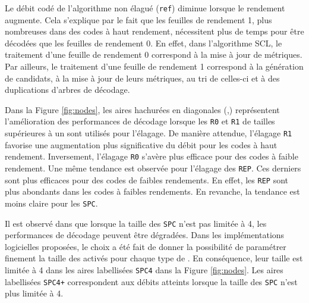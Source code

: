 Le débit codé de l'algorithme non élagué (\texttt{ref}) diminue lorsque le rendement augmente. Cela s'explique par le fait que les feuilles de rendement 1, plus nombreuses dans des codes à haut rendement, nécessitent plus de temps pour être décodées que les feuilles de rendement 0. En effet, dans l'algorithme SCL, le traitement d'une feuille de rendement 0 correspond à la mise à jour de métriques. Par ailleurs, le traitement d'une feuille de rendement 1 correspond à la génération de candidats, à la mise à jour de leurs métriques, au tri de celles-ci et à des duplications d'arbres de décodage.

Dans la Figure \ref{fig:nodes}, les aires hachurées en diagonales (,) représentent l'amélioration des performances de décodage lorsque les \noeuds \texttt{R0} et \texttt{R1} de tailles supérieures à un sont utilisés pour l'élagage. De manière attendue, l'élagage \texttt{R1} favorise une augmentation plus significative du débit pour les codes à haut rendement. Inversement, l'élagage \texttt{R0} s'avère plus efficace pour des codes à faible rendement. Une même tendance est observée pour l'élagage des \noeuds \texttt{REP}. Ces derniers sont plus efficaces pour des codes de faibles rendements. En effet, les \noeuds \texttt{REP} sont plus abondants dans les codes à faibles rendements. En revanche, la tendance est moins claire pour les \noeuds \texttt{SPC}.

Il est observé dans \cite{sarkis_fast_2014} que lorsque la taille des \noeuds \texttt{SPC} n'est pas limitée à 4, les performances de décodage peuvent être dégradées. Dans les implémentations logicielles proposées, le choix a été fait de donner la possibilité de paramétrer finement la taille des \noeuds activés pour chaque type de \noeuds. En conséquence, leur taille est limitée à 4 dans les aires labellisées \texttt{SPC4} dans la Figure \ref{fig:nodes}. Les aires labellisées \noeuds \texttt{SPC4+} correspondent aux débits atteints lorsque la taille des \noeuds \texttt{SPC} n'est plus limitée à 4.

